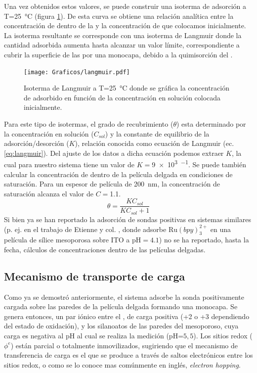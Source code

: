 		Una vez obtenidos estos valores, se puede construir una isoterma de adsorción a T=\SI{25}{\celsius} (figura \ref{fig:langmuir}). De esta curva se obtiene una relación analítica entre la concentración de \ru\space dentro de la \pdm\space y la concentración de \ru\space que colocamos inicialmente. La isoterma resultante se corresponde con una isoterma de Langmuir donde la cantidad adsorbida aumenta hasta alcanzar un valor límite, correspondiente a cubrir la superficie de las \pdm\space por una monocapa, debido a la quimisorción del \ru.\cite{langmuir1918}

			\begin{figure}[ht]
					\centering
			 	    \texttt{[image: Graficos/langmuir.pdf]}
			        \caption[Isoterma de Langmuir]{Isoterma de Langmuir a T=\SI{25}{\celsius} donde se gráfica la concentración de \aminorutenio\space adsorbido en función de la concentración en solución colocada inicialmente.}
			        \label{fig:langmuir}
			      	\end{figure} 	
	
		Para este tipo de isotermas, el grado de recubrimiento ($\theta$) esta determinado por la concentración en solución ($C_{sol}$) y la constante de equilibrio de la adsorción/desorción ($K$), relación conocida como ecuación de Langmuir (ec. \ref{eq:langmuir}).  Del ajuste de los datos a dicha ecuación podemos extraer $K$, la cual para nuestro sistema tiene un valor de $K=$\SI{9e3}{\Molar^{-1}}. Se puede también calcular la concentración de \ru\space dentro de la película delgada en condiciones de saturación. Para un espesor de película de \SI{200}{nm}, la concentración de saturación alcanza el valor de $C\!=$\SI{1.1}{\Molar}.
			\begin{equation}
					\theta = \frac{KC_{sol}}{KC_{sol}+1}
					\label{eq:langmuir}
			\end{equation}
		Si bien ya se han reportado la adsorción de sondas positivas en sistemas similares (p. ej. en el trabajo de Etienne y col. \cite{Etienne2007}, donde adsorbe $\text{Ru}(bpy)_3^{2+}$ en una película de sílice mesoporosa sobre ITO a $\text{pH}=4.1$) no se ha reportado, hasta la fecha, cálculos de concentraciones dentro de las películas delgadas.

	\subsection{Mecanismo de transporte de carga}

	 	 Como ya se demostró anteriormente, el sistema adsorbe la sonda positivamente cargada sobre las paredes de la película delgada formando una monocapa. Se genera entonces, un par iónico entre el \ru, de carga positiva (+2 o +3 dependiendo del estado de oxidación), y los silanoatos de las paredes del mesoporoso, cuya carga es negativa al pH al cual se realiza la medición (pH=$5,5$). Los sitios redox ($\phi^{e}$) están parcial o totalmente inmovilizados, sugiriendo que el mecanismo de transferencia de carga es el que se produce a través de saltos electrónicos entre los sitios redox, o como se lo conoce mas comúnmente en inglés, \textit{electron hopping}. \cite{Rohlfing2005,Vila2015,Audebert2015}

